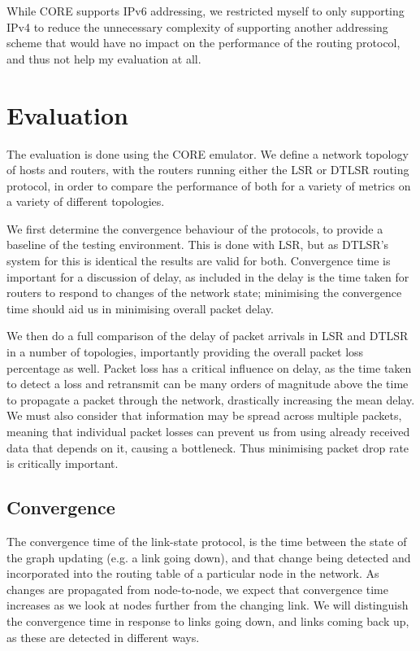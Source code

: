 \documentclass[withindex,glossary,openany]{cam-thesis}
\begin{document}
While CORE supports IPv6 addressing, we restricted myself to only supporting IPv4 to reduce the unnecessary complexity of supporting another addressing scheme that would have no impact on the performance of the routing protocol, and thus not help my evaluation at all.


\chapter{Evaluation}
\label{chapter:evaluation}

The evaluation is done using the CORE emulator. We define a network topology of hosts and routers, with the routers running either the LSR or DTLSR routing protocol, in order to compare the performance of both for a variety of metrics on a variety of different topologies.

We first determine the convergence behaviour of the protocols, to provide a baseline of the testing environment. This is done with LSR, but as DTLSR's system for this is identical the results are valid for both. Convergence time is important for a discussion of delay, as included in the delay is the time taken for routers to respond to changes of the network state; minimising the convergence time should aid us in minimising overall packet delay.

We then do a full comparison of the delay of packet arrivals in LSR and DTLSR in a number of topologies, importantly providing the overall packet loss percentage as well. Packet loss has a critical influence on delay, as the time taken to detect a loss and retransmit can be many orders of magnitude above the time to propagate a packet through the network, drastically increasing the mean delay. We must also consider that information may be spread across multiple packets, meaning that individual packet losses can prevent us from using already received data that depends on it, causing a bottleneck. Thus minimising packet drop rate is critically important.

\section{Convergence}

The convergence time of the link-state protocol, is the time between the state of the graph updating (e.g. a link going down), and that change being detected and incorporated into the routing table of a particular node in the network. As changes are propagated from node-to-node, we expect that convergence time increases as we look at nodes further from the changing link. We will distinguish the convergence time in response to links going down, and links coming back up, as these are detected in different ways. 
\end{document}
